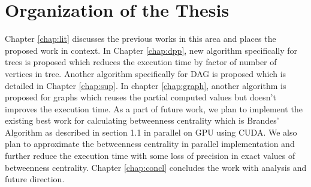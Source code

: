 \vspace{-1.0em}
\section{Organization of the Thesis}
\vspace{-1.0em}
Chapter \ref{chap:lit} discusses the previous works in this area and places the proposed work in context. In Chapter \ref{chap:dpp}, new algorithm specifically for trees is proposed which reduces the execution time by factor of number of vertices in tree. Another algorithm specifically for DAG is proposed which is detailed in Chapter \ref{chap:sup}. In chapter \ref{chap:graph}, another algorithm is proposed for graphs which reuses the partial computed values but doesn't improves the execution time. As a part of future work, we plan to implement the existing best work for calculating betweenness centrality which is Brandes' Algorithm as described in section 1.1 in parallel on GPU using CUDA. We also plan to approximate the betweenness centrality in parallel implementation and further reduce the execution time with some loss of precision in exact values of betweenness centrality. Chapter \ref{chap:concl} concludes the work with analysis and future direction.